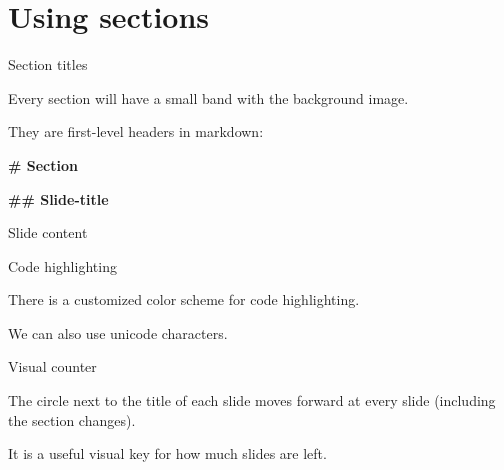 \documentclass[11pt, compress, aspectratio=1610]{beamer}
\newenvironment{Shaded}{\begin{mdframed}}{\end{mdframed}}
\newcommand{\KeywordTok}[1]{\textcolor[rgb]{0.26,0.66,0.93}{\textbf{{#1}}}}
\newcommand{\FloatTok}[1]{\textcolor[HTML]{558B2F}{{#1}}}
\newcommand{\CharTok}[1]{\textcolor[HTML]{7E57C2}{{#1}}}
\newcommand{\SpecialCharTok}[1]{\textcolor[HTML]{7E57C2}{{#1}}}
\newcommand{\StringTok}[1]{\textcolor[HTML]{7E57C2}{{#1}}}
\newcommand{\CommentTok}[1]{\textcolor[HTML]{546E7A}{\textit{{#1}}}}
\newcommand{\FunctionTok}[1]{\textcolor[HTML]{26A69A}{\textbf{{#1}}}}
\newcommand{\NormalTok}[1]{\textcolor[HTML]{212121}{{#1}}}
\begin{document}
\hypertarget{using-sections}{%
\section{Using sections}\label{using-sections}}

\begin{frame}[fragile]{%
\protect\hypertarget{section-titles}{%
Section titles}}

Every section will have a small band with the background image.

They are first-level headers in markdown:

\begin{Shaded}
\begin{Highlighting}[]
\FunctionTok{# Section}

\FunctionTok{## Slide-title}

\NormalTok{Slide content}
\end{Highlighting}
\end{Shaded}

\end{frame}

\begin{frame}[fragile]{%
\protect\hypertarget{code-highlighting}{%
Code highlighting}}

There is a customized color scheme for code highlighting.

\begin{Shaded}
\end{Shaded}

We can also use \alert{unicode characters}.

\end{frame}

\begin{frame}{%
\protect\hypertarget{visual-counter}{%
Visual counter}}

The circle next to the title of each slide moves forward at every slide
(including the section changes).

It is a useful visual key for how much slides are left.

\end{frame}
\end{document}
